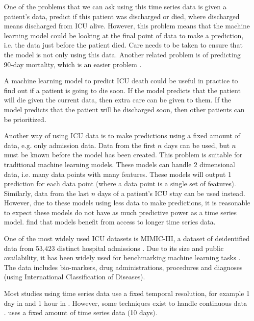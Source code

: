 \documentclass[12pt]{article}
\begin{document}
One of the problems that we can ask using this time series data is given a patient's data, predict if this patient was discharged or died, where discharged means discharged from ICU alive. However, this problem means that the machine learning model could be looking at the final point of data to make a prediction, i.e. the data just before the patient died. Care needs to be taken to ensure that the model is not only using this data. Another related problem is of predicting 90-day mortality, which is an easier problem \cite{ICUFancyLSTM}.

A machine learning model to predict ICU death could be useful in practice to find out if a patient is going to die soon. If the model predicts that the patient will die given the current data, then extra care can be given to them. If the model predicts that the patient will be discharged soon, then other patients can be prioritized.

Another way of using ICU data is to make predictions using a fixed amount of data, e.g. only admission data. Data from the first $n$ days can be used, but $n$ must be known before the model has been created. This problem is suitable for traditional machine learning models. These models can handle 2 dimensional data, i.e. many data points with many features. These models will output 1 prediction for each data point (where a data point is a single set of features). Similarly, data from the last $n$ days of a patient's ICU stay can be used instead. However, due to these models using less data to make predictions, it is reasonable to expect these models do not have as much predictive power as a time series model. \cite{KajiLSTM,ICUFancyLSTM} find that models benefit from access to longer time series data.

One of the most widely used ICU datasets is MIMIC-III, a dataset of deidentified data from 53,423 distinct hospital admissions \cite{MIMICIIIdatabase}. Due to its size and public availability, it has been widely used for benchmarking machine learning tasks \cite{XGBoostICU}. The data includes bio-markers, drug administrations, procedures and diagnoses (using International Classification of Diseases).

Most studies using time series data use a fixed temporal resolution, for example 1 day in \cite{KajiLSTM,eLSTM} and 1 hour in \cite{ICUFancyLSTM,ICUBidirectionalLSTM}. However, some techniques exist to handle continuous data \cite{GRUODE}. \cite{eLSTM} uses a fixed amount of time series data (10 days).
\end{document}
